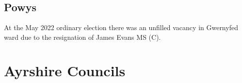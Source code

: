 \documentclass[a4paper,openany]{book}
\begin{document}
\begin{resultsiii}
\subsection*{Powys}

At the May 2022 ordinary election there was an unfilled vacancy in Gwernyfed ward due to the resignation of James Evans MS (C).%

%
%
%
%
%
%
%

\section{Ayrshire Councils}


\end{resultsiii}
\end{document}

